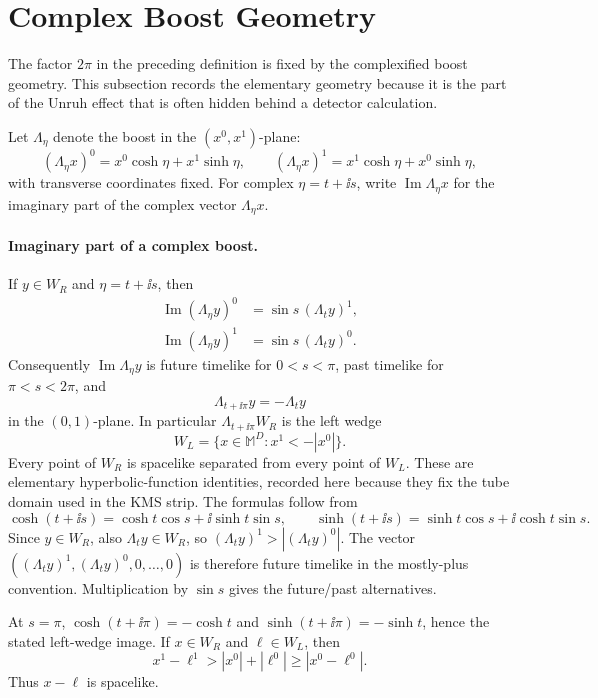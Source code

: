 \section{Complex Boost Geometry}

The factor \(2\pi\) in the preceding definition is fixed by the complexified
boost geometry.  This subsection records the elementary geometry because it
is the part of the Unruh effect that is often hidden behind a detector
calculation.

Let \(\Lambda_\eta\) denote the boost in the \((x^0,x^1)\)-plane:
\[
  (\Lambda_\eta x)^0=x^0\cosh\eta+x^1\sinh\eta,\qquad
  (\Lambda_\eta x)^1=x^1\cosh\eta+x^0\sinh\eta,
\]
with transverse coordinates fixed.  For complex \(\eta=t+\ii s\), write
\(\operatorname{Im}\Lambda_\eta x\) for the imaginary part of the complex
vector \(\Lambda_\eta x\).

\paragraph{Imaginary part of a complex boost.}
If \(y\in W_R\) and \(\eta=t+\ii s\), then
\[
\begin{aligned}
  \operatorname{Im}(\Lambda_\eta y)^0
  &=\sin s\,(\Lambda_t y)^1,\\
  \operatorname{Im}(\Lambda_\eta y)^1
  &=\sin s\,(\Lambda_t y)^0 .
\end{aligned}
\]
Consequently \(\operatorname{Im}\Lambda_\eta y\) is future timelike for
\(0<s<\pi\), past timelike for \(\pi<s<2\pi\), and
\[
  \Lambda_{t+\ii\pi}y=-\Lambda_t y
\]
in the \((0,1)\)-plane.  In particular \(\Lambda_{t+\ii\pi}W_R\) is the
left wedge
\[
  W_L=\{x\in\mathbb M^D:x^1<-|x^0|\}.
\]
Every point of \(W_R\) is spacelike separated from every point of \(W_L\).
These are elementary hyperbolic-function identities, recorded here because
they fix the tube domain used in the KMS strip.  The formulas follow from
\[
  \cosh(t+\ii s)=\cosh t\cos s+\ii\sinh t\sin s,\qquad
  \sinh(t+\ii s)=\sinh t\cos s+\ii\cosh t\sin s .
\]
Since \(y\in W_R\), also \(\Lambda_t y\in W_R\), so
\((\Lambda_t y)^1>|(\Lambda_t y)^0|\).  The vector
\(((\Lambda_t y)^1,(\Lambda_t y)^0,0,\ldots,0)\) is therefore future
timelike in the mostly-plus convention.  Multiplication by \(\sin s\) gives
the future/past alternatives.

At \(s=\pi\), \(\cosh(t+\ii\pi)=-\cosh t\) and
\(\sinh(t+\ii\pi)=-\sinh t\), hence the stated left-wedge image.  If
\(x\in W_R\) and \(\ell\in W_L\), then
\[
  x^1-\ell^1>|x^0|+|\ell^0|\ge |x^0-\ell^0|.
\]
Thus \(x-\ell\) is spacelike.


